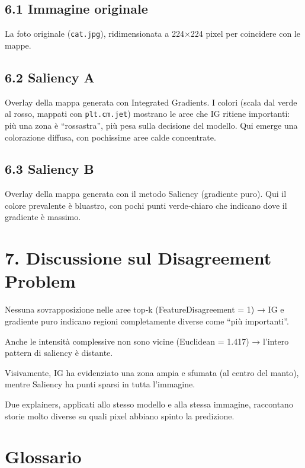\documentclass[a4paper,11pt]{article}
\begin{document}
\subsection*{6.1 Immagine originale}
La foto originale (\texttt{cat.jpg}), ridimensionata a 224×224 pixel per coincidere con le mappe.

\subsection*{6.2 Saliency A}
Overlay della mappa generata con Integrated Gradients. I colori (scala dal verde al rosso, mappati con \texttt{plt.cm.jet}) mostrano le aree che IG ritiene importanti: più una zona è “rossastra”, più pesa sulla decisione del modello. Qui emerge una colorazione diffusa, con pochissime aree calde concentrate.

\subsection*{6.3 Saliency B}
Overlay della mappa generata con il metodo Saliency (gradiente puro). Qui il colore prevalente è bluastro, con pochi punti verde‐chiaro che indicano dove il gradiente è massimo.

\section*{7. Discussione sul Disagreement Problem}
Nessuna sovrapposizione nelle aree top‐k (FeatureDisagreement = 1) → IG e gradiente puro indicano regioni completamente diverse come “più importanti”.

Anche le intensità complessive non sono vicine (Euclidean = 1.417) → l’intero pattern di saliency è distante.

Visivamente, IG ha evidenziato una zona ampia e sfumata (al centro del manto), mentre Saliency ha punti sparsi in tutta l’immagine.

Due explainers, applicati allo stesso modello e alla stessa immagine, raccontano storie molto diverse su quali pixel abbiano spinto la predizione.

\section*{Glossario}
\end{document}
